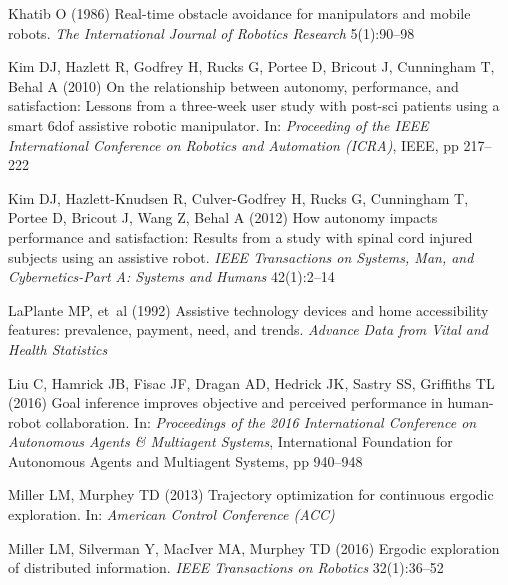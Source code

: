 \documentclass[natbib, twocolumn]{svjour3}          %
\begin{document}
\begin{thebibliography}{54}
	Khatib O (1986) Real-time obstacle avoidance for manipulators and mobile
	robots. \textit{The International Journal of Robotics Research} 5(1):90--98
	
	Kim DJ, Hazlett R, Godfrey H, Rucks G, Portee D, Bricout J, Cunningham T, Behal
	A (2010) On the relationship between autonomy, performance, and satisfaction:
	Lessons from a three-week user study with post-sci patients using a smart
	6dof assistive robotic manipulator. In: \textit{Proceeding of the IEEE
		International Conference on Robotics and Automation (ICRA)}, IEEE, pp
	217--222
	
	Kim DJ, Hazlett-Knudsen R, Culver-Godfrey H, Rucks G, Cunningham T, Portee D,
	Bricout J, Wang Z, Behal A (2012) How autonomy impacts performance and
	satisfaction: Results from a study with spinal cord injured subjects using an
	assistive robot. \textit{IEEE Transactions on Systems, Man, and
		Cybernetics-Part A: Systems and Humans} 42(1):2--14
	
	LaPlante MP, et~al (1992) Assistive technology devices and home accessibility
	features: prevalence, payment, need, and trends. \textit{Advance Data from
		Vital and Health Statistics}
	
	Liu C, Hamrick JB, Fisac JF, Dragan AD, Hedrick JK, Sastry SS, Griffiths TL
	(2016) Goal inference improves objective and perceived performance in
	human-robot collaboration. In: \textit{Proceedings of the 2016 International
		Conference on Autonomous Agents \& Multiagent Systems}, International
	Foundation for Autonomous Agents and Multiagent Systems, pp 940--948
	
	Miller LM, Murphey TD (2013) Trajectory optimization for continuous ergodic
	exploration. In: \textit{American Control Conference (ACC)}
	
	Miller LM, Silverman Y, MacIver MA, Murphey TD (2016) Ergodic exploration of
	distributed information. \textit{IEEE Transactions on Robotics} 32(1):36--52
	

\end{thebibliography}
\end{document}
